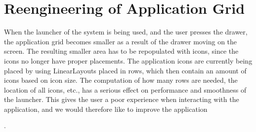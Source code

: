 
\section{Reengineering of Application Grid}
\label{sec:reengineering_of_application_grid}

When the launcher of the \giraf system is being used, and the user presses the drawer, the application grid becomes smaller as a result of the drawer moving on the screen. The resulting smaller area has to be repopulated with icons, since the icons no longer have proper placements. The application icons are currently being placed by using LinearLayouts placed in rows, which then contain an amount of icons based on icon size. The computation of how many rows are needed, the location of all icons, etc., has a serious effect on performance and smoothness of the launcher. This gives the user a poor experience when interacting with the application, and we would therefore like to improve the application 

.